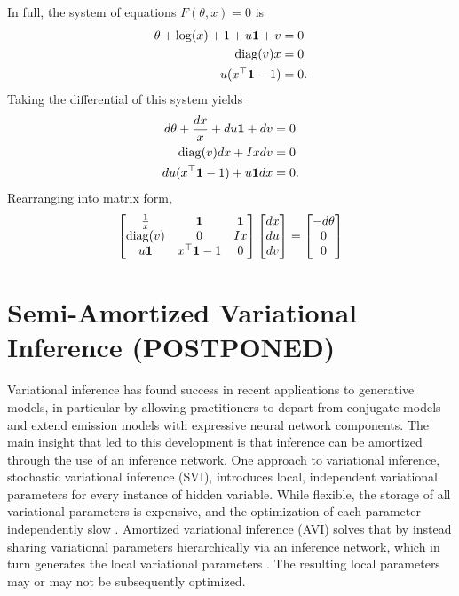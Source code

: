 \documentclass[11pt]{article}
\begin{document}
In full, the system of equations $F(\theta, x) = 0$ is
\begin{equation}
\label{eqn:system}
\begin{aligned}
\theta + \log(x) + 1 + u\mathbf{1} + v &= 0\\
\mathrm{diag}(v)x &= 0\\
u(x^{\top} \mathbf{1} - 1) &= 0.
\end{aligned}
\end{equation}
Taking the differential of this system yields
\begin{equation}
\label{eqn:dsystem}
\begin{aligned}
d\theta + \frac{dx}{x} + du\mathbf{1} + dv &= 0\\
\mathrm{diag}(v)dx + Ixdv &= 0\\
du(x^\top \mathbf{1} - 1) + u\mathbf{1}dx &= 0.
\end{aligned}
\end{equation}
Rearranging into matrix form,
\begin{equation}
\label{eqn:dsystem-matrix}
\begin{bmatrix}
\frac{1}{x} & \mathbf{1} & \mathbf{1} \\
\mathrm{diag}(v) & 0 & Ix \\
u\mathbf{1} & x^\top\mathbf{1} - 1 & 0
\end{bmatrix}
\begin{bmatrix}
dx \\ du \\ dv
\end{bmatrix}
=   
\begin{bmatrix}
-d\theta \\ 0 \\ 0
\end{bmatrix}
\end{equation}

\section{Semi-Amortized Variational Inference (POSTPONED)}
Variational inference has found success in recent applications to generative models,
in particular by allowing practitioners to depart from conjugate models
and extend emission models with expressive neural network components.
The main insight that led to this development is that inference can be amortized through
the use of an inference network.
One approach to variational inference, stochastic variational inference (SVI),
introduces local, independent variational parameters for every instance of hidden variable.
While flexible, the storage of all variational parameters is expensive, and the optimization
of each parameter independently slow \citep{}.
Amortized variational inference (AVI) solves that by instead sharing variational parameters hierarchically
via an inference network, which in turn generates the local variational parameters \citep{}.
The resulting local parameters may or may not be subsequently optimized.
\end{document}
